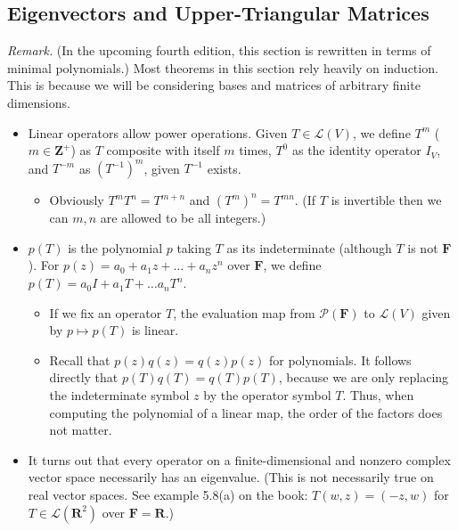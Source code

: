 \documentclass{article}
\newcommand{\R}{\mathbf{R}}
\newcommand{\Z}{\mathbf{Z}}
\newcommand{\F}{\mathbf{F}}
\newcommand{\LV}{\mathcal{L}(V)}
\newcommand{\PF}{\mathcal{P}(\F)}
\begin{document}
\subsection{Eigenvectors and Upper-Triangular Matrices}
\textit{Remark.} (In the upcoming fourth edition, this section is rewritten in terms of minimal polynomials.) Most theorems in this section rely heavily on induction. This is because we will be considering bases and matrices of arbitrary finite dimensions.
\begin{itemize}
    \item Linear operators allow power operations. Given $T \in \LV$, we define $T^m$ ($m \in \Z^+$) as $T$ composite with itself $m$ times, $T^0$ as the identity operator $I_V$, and $T^{-m}$ as $(T^{-1})^m$, given $T^{-1}$ exists.
    \begin{itemize}
        \item Obviously $T^mT^n = T^{m+n}$ and $(T^m)^n = T^{mn}$. (If $T$ is invertible then we can $m,n$ are allowed to be all integers.)
    \end{itemize}
    \item $p(T)$ is the polynomial $p$ taking $T$ as its indeterminate (although $T$ is not $\F$). For $p(z) = a_0 + a_1 z + \dots + a_n z^n$ over $\F$, we define $p(T) = a_0 I + a_1 T + \dots a_n T^n$.
    \begin{itemize}
        \item If we fix an operator $T$, the evaluation map from $\PF$ to $\LV$ given by $p \mapsto p(T)$ is linear.
    	\item Recall that $p(z)q(z) = q(z)p(z)$ for polynomials. It follows directly that $p(T)q(T) = q(T)p(T)$, because we are only replacing the indeterminate symbol $z$ by the operator symbol $T$. Thus, when computing the polynomial of a linear map, the order of the factors does not matter.
    \end{itemize}
    \item It turns out that every operator on a finite-dimensional and nonzero complex vector space necessarily has an eigenvalue. (This is not necessarily true on real vector spaces. See example 5.8(a) on the book: $T(w,z) = (-z,w)$ for $T \in \mathcal{L}(\R^2)$ over $\F = \R$.) 
    

\end{itemize}
\end{document}
